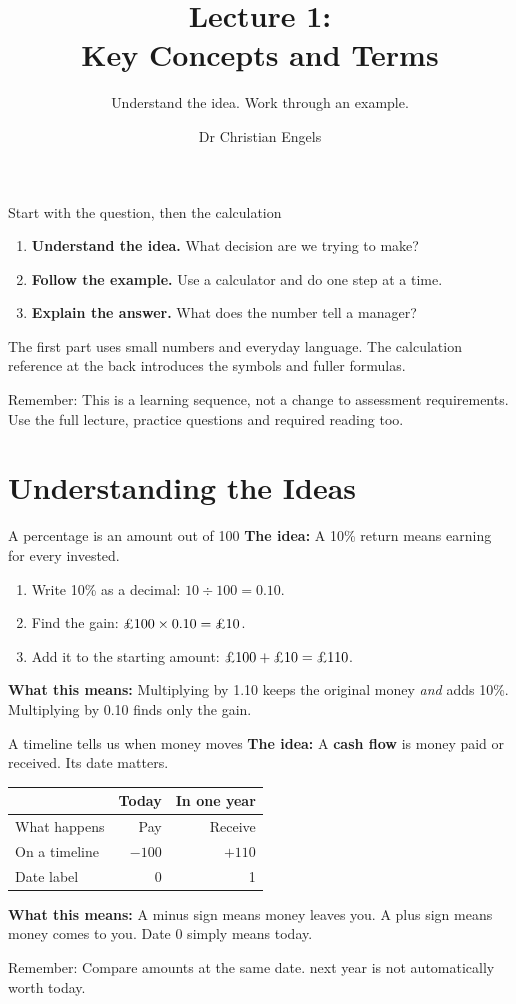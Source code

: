 \documentclass[10pt,aspectratio=169]{beamer}
\title{Lecture 1:\\Key Concepts and Terms}
\author{Dr Christian Engels}
\subtitle{Understand the idea. Work through an example.}
\newcommand{\idea}[1]{\textbf{The idea:} #1\par\smallskip}
\newcommand{\inpractice}[1]{\par\smallskip\textbf{What this means:} #1}
\newcommand{\remember}[1]{\par\smallskip\alert{Remember:} #1}
\renewcommand{\pounds}{\ifmmode\text{\textsterling}\else\textsterling\fi}
\begin{document}
\begin{frame}[plain]\titlepage\end{frame}

\begin{frame}{Start with the question, then the calculation}
\begin{enumerate}
\item \textbf{Understand the idea.} What decision are we trying to make?
\item \textbf{Follow the example.} Use a calculator and do one step at a time.
\item \textbf{Explain the answer.} What does the number tell a manager?
\end{enumerate}
\par\smallskip
The first part uses small numbers and everyday language. The calculation reference at the back introduces the symbols and fuller formulas.
\remember{This is a learning sequence, not a change to assessment requirements. Use the full lecture, practice questions and required reading too.}
\end{frame}

\section{Understanding the Ideas}
\begin{frame}{A percentage is an amount out of 100}
\idea{A 10\% return means earning \pounds10 for every \pounds100 invested.}
\begin{enumerate}
\item Write 10\% as a decimal: $10\div100=0.10$.
\item Find the gain: $\pounds100\times0.10=\pounds10$.
\item Add it to the starting amount: $\pounds100+\pounds10=\pounds110$.
\end{enumerate}
\inpractice{Multiplying by 1.10 keeps the original money \emph{and} adds 10\%. Multiplying by 0.10 finds only the gain.}
\end{frame}

\begin{frame}{A timeline tells us when money moves}
\idea{A \textbf{cash flow} is money paid or received. Its date matters.}
\par\smallskip\begingroup\centering
\begin{tabular}{lrr}
\toprule & Today & In one year\\\midrule
What happens & Pay \pounds100 & Receive \pounds110\\
On a timeline & $-100$ & $+110$\\
Date label & 0 & 1\\\bottomrule
\end{tabular}
\par\endgroup\smallskip
\inpractice{A minus sign means money leaves you. A plus sign means money comes to you. Date 0 simply means today.}
\remember{Compare amounts at the same date. \pounds110 next year is not automatically worth \pounds110 today.}
\end{frame}
\end{document}
